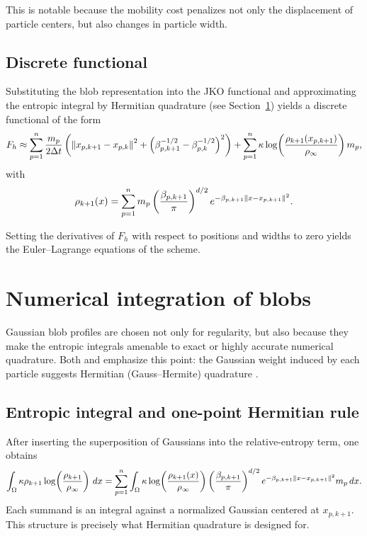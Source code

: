 \documentclass[11pt,a4paper]{article}
\begin{document}
This is notable because the mobility cost penalizes not only the displacement of particle centers, but also changes in particle width.

\subsection{Discrete functional}
Substituting the blob representation into the JKO functional and approximating the entropic integral by Hermitian quadrature (see Section~\ref{sec:hermite}) yields a discrete functional of the form
\begin{equation}
F_h \approx
\sum_{p=1}^{n}
\frac{m_p}{2\Delta t}
\left(
\norm{x_{p,k+1}-x_{p,k}}^2 +
\left(\beta_{p,k+1}^{-1/2}-\beta_{p,k}^{-1/2}\right)^2
\right)
+
\sum_{p=1}^{n}
\kappa \log\!\left(\frac{\rho_{k+1}(x_{p,k+1})}{\rho_\infty}\right)m_p,
\end{equation}
with
\begin{equation}
\rho_{k+1}(x)=
\sum_{p=1}^{n}
m_p
\left(\frac{\beta_{p,k+1}}{\pi}\right)^{d/2}
e^{-\beta_{p,k+1}\norm{x-x_{p,k+1}}^2}.
\end{equation}

Setting the derivatives of $F_h$ with respect to positions and widths to zero yields the Euler--Lagrange equations of the scheme.

\section{Numerical integration of blobs}
\label{sec:hermite}
Gaussian blob profiles are chosen not only for regularity, but also because they make the entropic integrals amenable to exact or highly accurate numerical quadrature. Both \citet{pandolfi2023} and \citet{pandolfi2025} emphasize this point: the Gaussian weight induced by each particle suggests Hermitian (Gauss--Hermite) quadrature \citep{hildebrand2013}.

\subsection{Entropic integral and one-point Hermitian rule}
After inserting the superposition of Gaussians into the relative-entropy term, one obtains
\begin{equation}
\int_{\Omega}
\kappa \rho_{k+1}\log\!\left(\frac{\rho_{k+1}}{\rho_\infty}\right)\,dx
=
\sum_{p=1}^{n}
\int_{\Omega}
\kappa \log\!\left(\frac{\rho_{k+1}(x)}{\rho_\infty}\right)
\left(\frac{\beta_{p,k+1}}{\pi}\right)^{d/2}
e^{-\beta_{p,k+1}\norm{x-x_{p,k+1}}^2}
m_p\,dx.
\end{equation}
Each summand is an integral against a normalized Gaussian centered at $x_{p,k+1}$. This structure is precisely what Hermitian quadrature is designed for.
\end{document}

